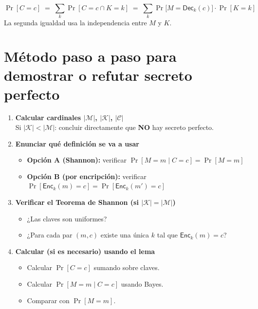 \documentclass[11pt,a4paper]{article}
\begin{document}
\begin{tcolorbox}[defstyle, title={Lema auxiliar}]
\[
  \Pr[C{=}c] \;=\; \sum_k \Pr[C{=}c \cap K{=}k]
             \;=\; \sum_k \Pr\!\bigl[M = \mathsf{Dec}_k(c)\bigr] \cdot \Pr[K{=}k]
\]
La segunda igualdad usa la independencia entre $M$ y $K$.
\end{tcolorbox}

\section{Método paso a paso para demostrar o refutar secreto perfecto}

\begin{tcolorbox}[methodstyle, title={Método paso a paso}]
\begin{enumerate}[label=\textbf{Paso \arabic{*} ---}, leftmargin=3.5em, itemsep=4pt]
  \item \textbf{Calcular cardinales $|\mathcal{M}|$, $|\mathcal{K}|$, $|\mathcal{C}|$}\\
    Si $|\mathcal{K}| < |\mathcal{M}|$: concluir directamente que \textbf{NO} hay secreto perfecto.

  \item \textbf{Enunciar qué definición se va a usar}
    \begin{itemize}[leftmargin=1.5em, itemsep=1pt]
      \item \textbf{Opción A (Shannon):} verificar $\Pr[M{=}m \mid C{=}c] = \Pr[M{=}m]$
      \item \textbf{Opción B (por encripción):} verificar $\Pr[\mathsf{Enc}_k(m){=}c] = \Pr[\mathsf{Enc}_k(m'){=}c]$
    \end{itemize}

  \item \textbf{Verificar el Teorema de Shannon (si $|\mathcal{K}|{=}|\mathcal{M}|$)}
    \begin{itemize}[leftmargin=1.5em, itemsep=1pt]
      \item ¿Las claves son uniformes?
      \item ¿Para cada par $(m,c)$ existe una única $k$ tal que $\mathsf{Enc}_k(m){=}c$?
    \end{itemize}

  \item \textbf{Calcular (si es necesario) usando el lema}
    \begin{itemize}[leftmargin=1.5em, itemsep=1pt]
      \item Calcular $\Pr[C{=}c]$ sumando sobre claves.
      \item Calcular $\Pr[M{=}m \mid C{=}c]$ usando Bayes.
      \item Comparar con $\Pr[M{=}m]$.
    \end{itemize}


\end{enumerate}
\end{tcolorbox}
\end{document}
